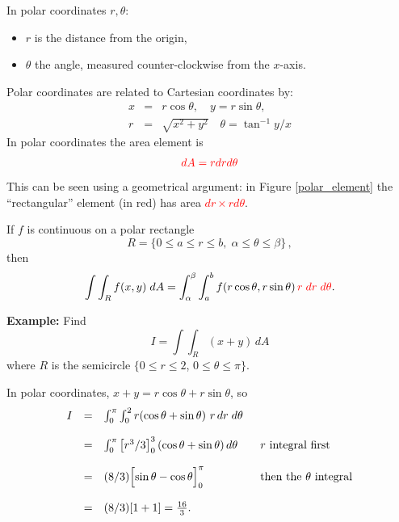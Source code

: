 \documentclass{article}
\begin{document}
%

In polar coordinates $r, \theta$:
\begin{itemize}
\item
$r$ is the distance from the origin, 
\item
$\theta$ the angle, measured counter-clockwise from the $x$-axis. 
\end{itemize}
Polar coordinates are related to Cartesian coordinates by:
{\small
$$
\begin{array}{lll}
x & = & r \cos \theta, \quad y=r \sin \theta, \\
r & = & \sqrt{x^2+y^2} \quad \theta = \tan^{-1} y/x
\end{array}
$$
}
In polar coordinates the area element is 
$$
\textcolor{red}{dA = r dr d \theta}
$$
This can be seen using a geometrical argument: in Figure \ref{polar_element} the
``rectangular'' element (in red) has area \textcolor{red}{$dr \times r d \theta$}.

If $f$ is continuous on a polar rectangle 
$$
R =  \lbrace 0 \le a
\le r \le b, \; \alpha \le \theta \le \beta\rbrace\,,
$$ 
then
$$
\int \int _R f(x,y) \; d A = \int_{\alpha}^{\beta} \int_a^b f( r
\cos \theta, r \sin \theta) \,\textcolor{red}{r \; dr \;  d \theta}.
$$



\textbf{Example:} Find
$$
I = \int \int_R (x+y) \, dA
$$ where $R$ is the semicircle $\lbrace 0 \leq r \leq 2$, $0 \leq  \theta \leq \pi \rbrace$.
\vspace{2mm}

In polar coordinates, $x+y = r \cos \theta + r \sin \theta$, so
$$
\begin{array}{llll}
I & = & \int_0^{\pi} \int_0^2 r (\cos \theta + \sin \theta) \, \, r \,dr\; d \theta & \\
\\
 & = & \int_0^{\pi}  \left[ r^3/3 \right]_0^3 (\cos \theta + \sin \theta) \, d \theta \quad & r \mbox{ integral first}\\
 \\
 & = & (8/3)  \Bigl[ \sin \theta - \cos \theta \Bigr]_0^{\pi} & \mbox{then the } \theta \mbox{ integral}\\
 \\
  & = & (8/3) [1+1] = \frac{16}{3}. &
  \end{array}
$$
\end{document}
